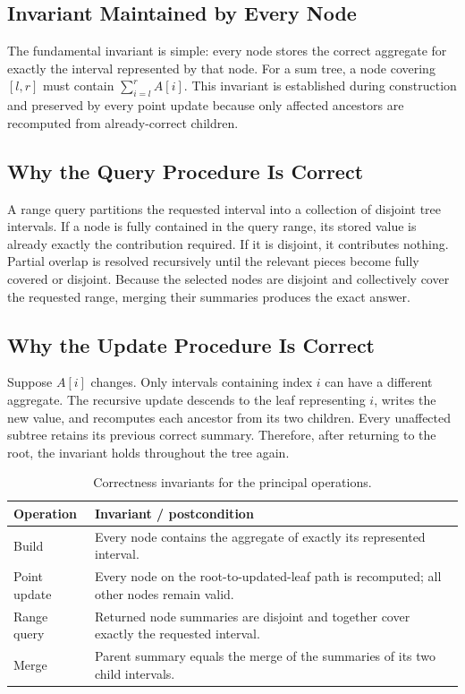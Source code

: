 \documentclass[11pt,open=any,headings=option]{scrreprt}
\begin{document}
\subsection{Invariant Maintained by Every Node}
The fundamental invariant is simple: every node stores the correct aggregate for exactly the interval represented by that node. For a sum tree, a node covering $[l,r]$ must contain $\sum_{i=l}^{r}A[i]$. This invariant is established during construction and preserved by every point update because only affected ancestors are recomputed from already-correct children.

\subsection{Why the Query Procedure Is Correct}
A range query partitions the requested interval into a collection of disjoint tree intervals. If a node is fully contained in the query range, its stored value is already exactly the contribution required. If it is disjoint, it contributes nothing. Partial overlap is resolved recursively until the relevant pieces become fully covered or disjoint. Because the selected nodes are disjoint and collectively cover the requested range, merging their summaries produces the exact answer.

\subsection{Why the Update Procedure Is Correct}
Suppose $A[i]$ changes. Only intervals containing index $i$ can have a different aggregate. The recursive update descends to the leaf representing $i$, writes the new value, and recomputes each ancestor from its two children. Every unaffected subtree retains its previous correct summary. Therefore, after returning to the root, the invariant holds throughout the tree again.

\begin{table}[H]
\centering
\caption{Correctness invariants for the principal operations.}
\label{tab:invariants}
\begin{tabular}{p{3.2cm}p{9.1cm}}
\toprule
\textbf{Operation} & \textbf{Invariant / postcondition}\\
\midrule
Build & Every node contains the aggregate of exactly its represented interval.\\
Point update & Every node on the root-to-updated-leaf path is recomputed; all other nodes remain valid.\\
Range query & Returned node summaries are disjoint and together cover exactly the requested interval.\\
Merge & Parent summary equals the merge of the summaries of its two child intervals.\\
\bottomrule
\end{tabular}
\end{table}
\end{document}
